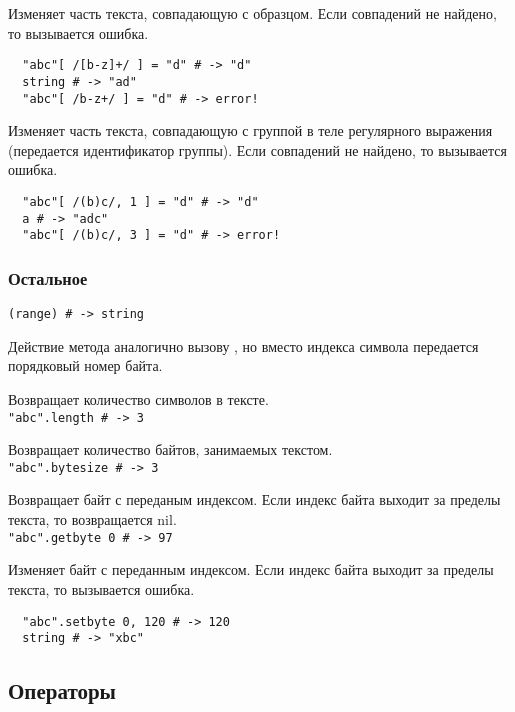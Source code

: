 \begin{methodlist}
  Изменяет часть текста, совпадающую с образцом. Если совпадений не найдено, то вызывается ошибка.
  \begin{verbatim}
  "abc"[ /[b-z]+/ ] = "d" # -> "d"
  string # -> "ad"
  "abc"[ /b-z+/ ] = "d" # -> error!
  \end{verbatim}

  Изменяет часть текста, совпадающую с группой в теле регулярного выражения (передается идентификатор группы). Если совпадений не найдено, то вызывается ошибка.
  \begin{verbatim}
  "abc"[ /(b)c/, 1 ] = "d" # -> "d"
  a # -> "adc"
  "abc"[ /(b)c/, 3 ] = "d" # -> error!
  \end{verbatim}
\end{methodlist}

\subsubsection*{Остальное}

\begin{methodlist}
  \verb!(range) # -> string!

  Действие метода аналогично вызову , но вместо индекса символа передается порядковый номер байта.

  Возвращает количество символов в тексте.
  \\\verb!"abc".length # -> 3!

  Возвращает количество байтов, занимаемых текстом.
  \\\verb!"abc".bytesize # -> 3!

  Возвращает байт с переданым индексом. Если индекс байта выходит за пределы текста, то возвращается nil.
  \\\verb!"abc".getbyte 0 # -> 97!

  Изменяет байт с переданным индексом. Если индекс байта выходит за пределы текста, то вызывается ошибка.
  \begin{verbatim}
  "abc".setbyte 0, 120 # -> 120
  string # -> "xbc"
  \end{verbatim}
\end{methodlist}


\subsection*{Операторы}

